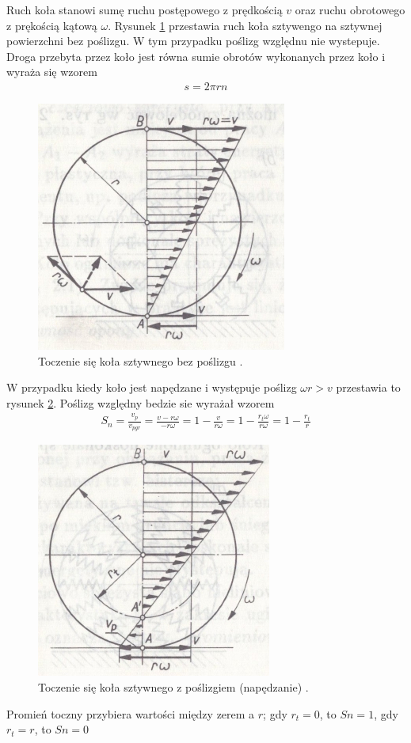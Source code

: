 \documentclass{article}
\begin{document}
	Ruch koła stanowi sumę ruchu postępowego z prędkością $v$ oraz ruchu obrotowego z prękością kątową $\omega$. Rysunek \ref{fig:toczenie_kol_sztywengo_bez_poslizgu} przestawia ruch koła sztywengo na sztywnej powierzchni bez poślizgu. W tym przypadku poślizg względnu nie wystepuje. Droga przebyta przez koło jest równa sumie obrotów wykonanych przez koło i wyraża się wzorem
	\begin{align}
		s=2\pi rn
	\end{align}
	\begin{figure}[h!]
		\centering
		\includegraphics[scale=1.5]{toczenie_kola_sztywnego_bez_poslizgu.jpg}
		\caption{Toczenie się koła sztywnego bez poślizgu \cite{Arczynski}.}
		\label{fig:toczenie_kol_sztywengo_bez_poslizgu}
	\end{figure}
	W przypadku kiedy koło jest napędzane i występuje poślizg $\omega r > v$ przestawia to rysunek \ref{fig:toczenie_kol_sztywengo_z_poslizgiem_napedzanie}.
	Poślizg względny bedzie sie wyrażał wzorem
	\begin{align}
		S_n=\frac{v_p}{v_{pgr}}=\frac{v-r\omega}{-r\omega}=1-\frac{v}{r\omega}=1-\frac{r_t\omega}{r\omega}=1-\frac{r_t}{r}
	\end{align}
	\begin{figure}[h!]
		\centering
		\includegraphics[scale=1.5]{toczenie_kola_sztywnego_z_poslizgiem_napedzanie.jpg}
		\caption{Toczenie się koła sztywnego z poślizgiem (napędzanie)  \cite{Arczynski}.}
		\label{fig:toczenie_kol_sztywengo_z_poslizgiem_napedzanie}
	\end{figure}
	Promień toczny przybiera wartości między zerem a $r$; gdy $r_t=0$, to $Sn=1$, gdy $r_t=r$, to $Sn=0$
\end{document}
